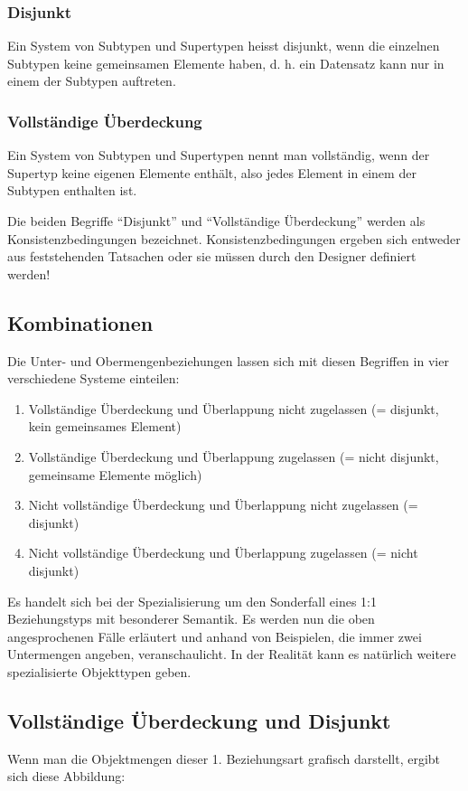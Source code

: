 \subsubsection{Disjunkt}
Ein System von Subtypen und Supertypen heisst disjunkt, wenn die
einzelnen Subtypen keine gemeinsamen Elemente haben, d. h. ein
Datensatz kann nur in einem der Subtypen auftreten.
\subsubsection{Vollständige Überdeckung}
Ein System von Subtypen und Supertypen nennt man vollständig, wenn
der Supertyp keine eigenen Elemente enthält, also jedes Element in
einem der Subtypen enthalten ist.

\begin{merke}
    Die beiden Begriffe \enquote{Disjunkt} und \enquote{Vollständige
        Überdeckung} werden als Konsistenzbedingungen bezeichnet.
    Konsistenzbedingungen ergeben sich entweder aus feststehenden
    Tatsachen oder sie müssen durch den Designer definiert werden!
\end{merke}

\subsection{Kombinationen}
Die Unter- und Obermengenbeziehungen lassen sich mit diesen Begriffen in
vier verschiedene Systeme einteilen:
\begin{enumerate}
    \item Vollständige Überdeckung und Überlappung nicht zugelassen (= disjunkt, kein gemeinsames Element)
    \item Vollständige Überdeckung und Überlappung zugelassen (= nicht disjunkt, gemeinsame Elemente möglich)
    \item Nicht vollständige Überdeckung und Überlappung nicht zugelassen (= disjunkt)
    \item Nicht vollständige Überdeckung und Überlappung zugelassen (= nicht disjunkt)
\end{enumerate}
Es handelt sich bei der Spezialisierung um den Sonderfall eines 1:1
Beziehungstyps mit besonderer Semantik. Es werden nun die oben
angesprochenen Fälle erläutert und anhand von Beispielen, die immer
zwei Untermengen angeben, veranschaulicht. In der Realität kann es
natürlich weitere spezialisierte Objekttypen geben.
\subsection{Vollständige Überdeckung und Disjunkt}
\label{complette_disjunkt}
Wenn man die Objektmengen dieser 1. Beziehungsart grafisch darstellt,
ergibt sich diese Abbildung:

